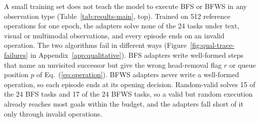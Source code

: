 A small training set does not teach the model to execute BFS or BFWS in any observation type (Table~\ref{tab:results-main}, top). Trained on 512 reference operations for one epoch, the adapters solve none of the 24 tasks under text, visual or multimodal observations, and every episode ends on an invalid operation. The two algorithms fail in different ways (Figure~\ref{fig:qual-trace-failures} in Appendix~\ref{app:qualitative}). BFS adapters write well-formed steps that name an unvisited successor but give the wrong head-removal flag $r$ or queue position $p$ of Eq.~(\ref{eq:operation}). BFWS adapters never write a well-formed operation, so each episode ends at its opening decision. Random-valid solves 15 of the 24 BFS tasks and 17 of the 24 BFWS tasks, so a valid but random execution already reaches most goals within the budget, and the adapters fall short of it only through invalid operations.

